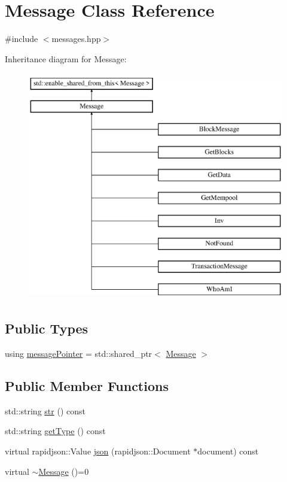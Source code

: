 \hypertarget{classMessage}{}\section{Message Class Reference}
\label{classMessage}


{\ttfamily \#include $<$messages.\+hpp$>$}

Inheritance diagram for Message\+:\begin{figure}[H]
\begin{center}
\leavevmode
\includegraphics[height=10.000000cm]{classMessage}
\end{center}
\end{figure}
\subsection*{Public Types}
\begin{DoxyCompactItemize}
\item 
using \mbox{\hyperlink{classMessage_a3f7f2aa1058cb5f0b74a1fbb7fcd00e5}{message\+Pointer}} = std\+::shared\+\_\+ptr$<$ \mbox{\hyperlink{classMessage}{Message}} $>$
\end{DoxyCompactItemize}
\subsection*{Public Member Functions}
\begin{DoxyCompactItemize}
\item 
std\+::string \mbox{\hyperlink{classMessage_afde1ad2efd7e7af3ed65bbbb08e2e172}{str}} () const
\item 
std\+::string \mbox{\hyperlink{classMessage_aeb65039d076cefaff79b21044a4d8d29}{get\+Type}} () const
\item 
virtual rapidjson\+::\+Value \mbox{\hyperlink{classMessage_a6f8e3ac2eed3a8afe9400fcd5b3447b2}{json}} (rapidjson\+::\+Document $\ast$document) const
\item 
virtual \mbox{\hyperlink{classMessage_ad7ecaab66dfea90ed7bf9a3147bcf129}{$\sim$\+Message}} ()=0
\end{DoxyCompactItemize}
